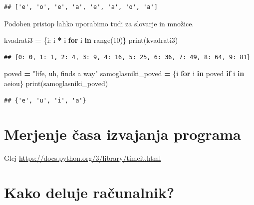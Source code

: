 \documentclass[
]{report}
\newenvironment{Shaded}{\begin{snugshade}}{\end{snugshade}}
\newcommand{\BuiltInTok}[1]{#1}
\newcommand{\ControlFlowTok}[1]{\textcolor[rgb]{0.13,0.29,0.53}{\textbf{#1}}}
\newcommand{\DecValTok}[1]{\textcolor[rgb]{0.00,0.00,0.81}{#1}}
\newcommand{\KeywordTok}[1]{\textcolor[rgb]{0.13,0.29,0.53}{\textbf{#1}}}
\newcommand{\NormalTok}[1]{#1}
\newcommand{\OperatorTok}[1]{\textcolor[rgb]{0.81,0.36,0.00}{\textbf{#1}}}
\newcommand{\StringTok}[1]{\textcolor[rgb]{0.31,0.60,0.02}{#1}}
\begin{document}
\begin{verbatim}
## ['e', 'o', 'e', 'a', 'e', 'a', 'o', 'a']
\end{verbatim}

Podoben pristop lahko uporabimo tudi za slovarje in množice.

\begin{Shaded}
\begin{Highlighting}[]
\NormalTok{kvadrati3 }\OperatorTok{=}\NormalTok{ \{i: i }\OperatorTok{*}\NormalTok{ i }\ControlFlowTok{for}\NormalTok{ i }\KeywordTok{in} \BuiltInTok{range}\NormalTok{(}\DecValTok{10}\NormalTok{)\}}
\BuiltInTok{print}\NormalTok{(kvadrati3)}
\end{Highlighting}
\end{Shaded}

\begin{verbatim}
## {0: 0, 1: 1, 2: 4, 3: 9, 4: 16, 5: 25, 6: 36, 7: 49, 8: 64, 9: 81}
\end{verbatim}

\begin{Shaded}
\begin{Highlighting}[]
\NormalTok{poved }\OperatorTok{=} \StringTok{"life, uh, finds a way"}
\NormalTok{samoglasniki\_poved }\OperatorTok{=}\NormalTok{ \{i }\ControlFlowTok{for}\NormalTok{ i }\KeywordTok{in}\NormalTok{ poved }\ControlFlowTok{if}\NormalTok{ i }\KeywordTok{in} \StringTok{\textquotesingle{}aeiou\textquotesingle{}}\NormalTok{\}}
\BuiltInTok{print}\NormalTok{(samoglasniki\_poved)}
\end{Highlighting}
\end{Shaded}

\begin{verbatim}
## {'e', 'u', 'i', 'a'}
\end{verbatim}

\hypertarget{merjenje-ux10dasa-izvajanja-programa}{%
\section{Merjenje časa izvajanja programa}\label{merjenje-ux10dasa-izvajanja-programa}}

Glej \url{https://docs.python.org/3/library/timeit.html}

\hypertarget{kako-deluje-raux10dunalnik}{%
\section{Kako deluje računalnik?}\label{kako-deluje-raux10dunalnik}}
\end{document}
